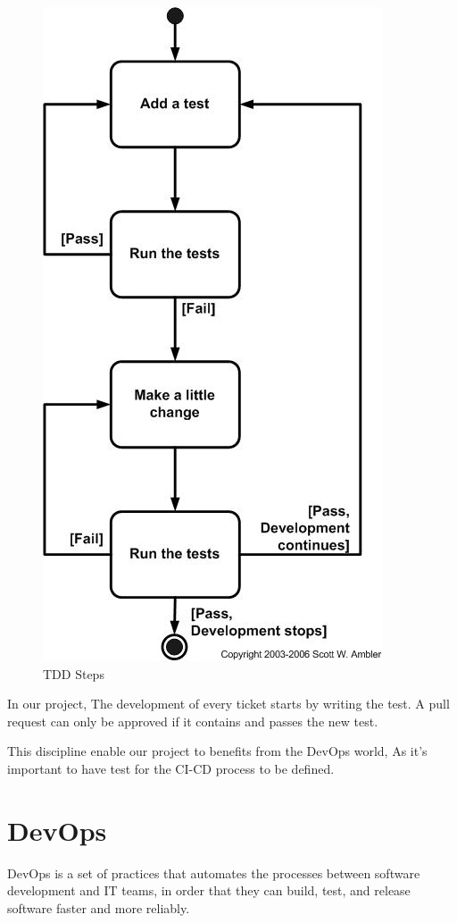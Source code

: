 \begin{spacing}{1.2}
\begin{figure}[!ht]\centering
\includegraphics[scale=0.6]{tddSteps.jpg}
\caption{TDD Steps}
\label{fig:fig1}
\end{figure}
\newpage
In our project, The development of every ticket starts by writing the test. A pull request can only be approved if it contains and passes the new test.

This discipline enable our project to benefits from the DevOps world, As it's important to have test for the CI-CD process to be defined.


\section{DevOps}
DevOps is a set of practices that automates the processes between software development and IT teams, in order that they can build, test, and release software faster and more reliably.


\end{spacing}
